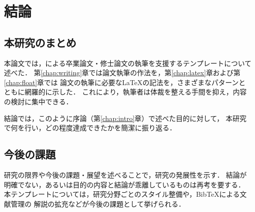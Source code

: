\chapter{結論}
\label{chap:conclusion}

\section{本研究のまとめ}
\label{sec:summary}
本論文では，\upLaTeX による卒業論文・修士論文の執筆を支援するテンプレートについて述べた．
第\ref{chap:writing}章では論文執筆の作法を，第\ref{chap:latex}章および第\ref{chap:float}章では
論文の執筆に必要な\LaTeX の記法を，さまざまなパターンとともに網羅的に示した．
これにより，執筆者は体裁を整える手間を抑え，内容の検討に集中できる．

結論では，このように序論（第\ref{chap:intro}章）で述べた目的に対して，
本研究で何を行い，どの程度達成できたかを簡潔に振り返る．

\section{今後の課題}
\label{sec:future}
研究の限界や今後の課題・展望を述べることで，研究の発展性を示す．
結論が明確でない，あるいは目的の内容と結論が乖離しているものは再考を要する\cite{ipsj-sample}．
本テンプレートについては，研究分野ごとのスタイル整備や，BibTeXによる文献管理の
解説の拡充などが今後の課題として挙げられる．
